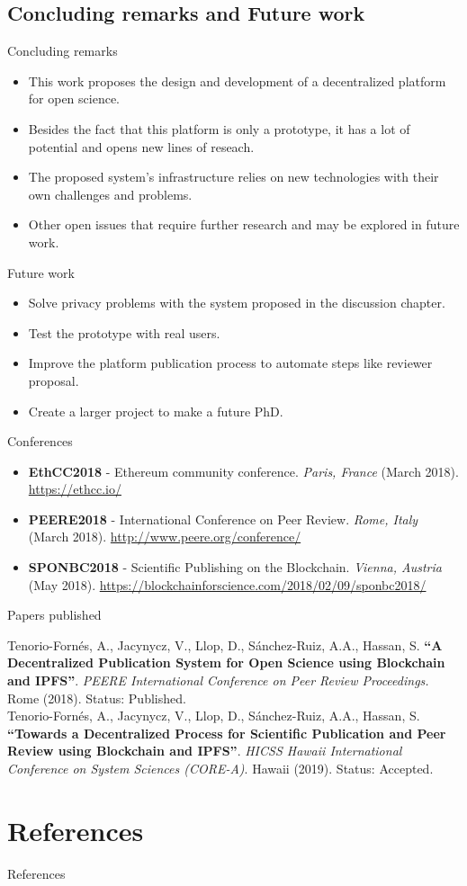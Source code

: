 \documentclass{beamer}
\newcommand{\framet}[2]{
  \begin{frame}{#1}
    #2
  \end{frame}
}
\begin{document}
\subsection{Concluding remarks and Future work}
\framet{Concluding remarks}{
\begin{itemize}
  \item This work proposes the design and development of a decentralized platform for open science.
  \item Besides the fact that this platform is only a prototype, it has a lot of potential and opens new lines of reseach.
  \item The proposed system's infrastructure relies on new technologies with their own challenges and problems.
  \item Other open issues that require further research and may be explored in future work.
\end{itemize}
}
\framet{Future work}{
\begin{itemize}
  \item Solve privacy problems with the system proposed in the discussion chapter.
  \item Test the prototype with real users.
  \item Improve the platform publication process to automate steps like reviewer proposal.
  \item Create a larger project to make a future PhD.
\end{itemize}
}

\framet{Conferences}{
\begin{itemize}
\item \textbf{EthCC2018} - Ethereum community conference. \emph{Paris, France} (March
  2018). \url{https://ethcc.io/}

\item \textbf{PEERE2018} - International Conference on Peer Review. \emph{Rome, Italy}
  (March 2018). \url{http://www.peere.org/conference/}

\item \textbf{SPONBC2018} - Scientific Publishing on the Blockchain. \emph{Vienna,
    Austria} (May 2018).
  \url{https://blockchainforscience.com/2018/02/09/sponbc2018/}
\end{itemize}

}

\framet{Papers published}{
Tenorio-Fornés, A., Jacynycz, V., Llop, D., Sánchez-Ruiz, A.A., Hassan, S.
\textbf{``A Decentralized Publication System for Open Science using Blockchain
  and IPFS''}. \emph{PEERE International Conference on Peer Review Proceedings.}
Rome (2018). Status: Published.
\vspace{10mm} \\
Tenorio-Fornés, A., Jacynycz, V., Llop, D., Sánchez-Ruiz, A.A., Hassan, S.
\textbf{``Towards a Decentralized Process for Scientific Publication and Peer
  Review using Blockchain and IPFS''}. \emph{HICSS Hawaii International Conference
  on System Sciences (CORE-A)}. Hawaii (2019). Status: Accepted.
  }

\section{References}
\begin{frame}[allowframebreaks]{References}

\printbibliography
\end{frame}
\end{document}
